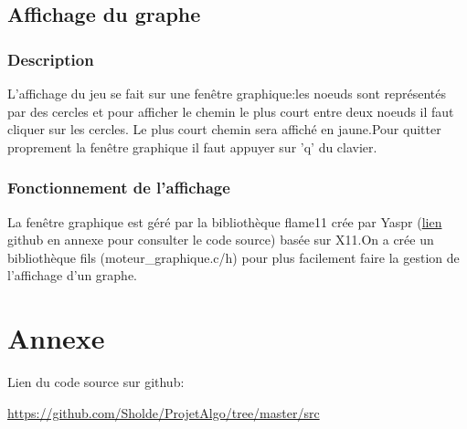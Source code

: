 \documentclass[a4paper,11pt]{report}
\begin{document}
\section{Affichage du graphe}
\subsection{Description}
L'affichage du jeu se fait sur une fenêtre graphique:les noeuds sont représentés par des cercles et pour afficher le chemin le plus court entre deux noeuds il faut cliquer sur les cercles. Le plus court chemin sera affiché en jaune.Pour quitter proprement la fenêtre graphique il faut appuyer sur 'q' du clavier.
\subsection{Fonctionnement de l'affichage}
La fenêtre graphique est géré par la bibliothèque flame11 crée par Yaspr (\href{https://github.com/yaspr/flame11}{lien} github en annexe pour consulter le code source) basée sur X11.On a crée un bibliothèque fils (moteur\_graphique.c/h) pour plus facilement faire la gestion de l'affichage d'un graphe. 

\chapter{Annexe}
Lien du code source sur github:
\begin{center}
    \url{https://github.com/Sholde/ProjetAlgo/tree/master/src}
\end{center}
\end{document}
